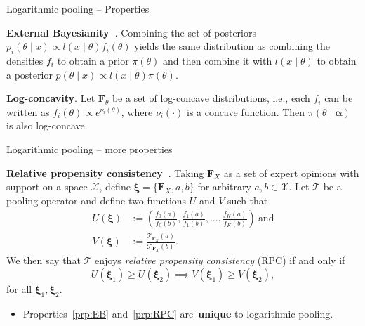 \begin{frame}{Logarithmic pooling -- Properties}
\begin{property}
\label{prp:EB}
 \textbf{External Bayesianity~\citep{genest1984}}. Combining the set of posteriors $p_i(\theta \mid x) \propto  l(x \mid \theta)f_i(\theta) $ yields the same distribution as combining the densities $f_i$ to obtain a prior $\pi(\theta)$ and then combine it with $l(x \mid \theta)$ to obtain a posterior $p(\theta \mid x) \propto l(x \mid \theta)\pi(\theta)$.
\end{property}

\begin{property}
\label{prp:concavity}
\textbf{Log-concavity}. 
 Let $\mathbf{F}_{\theta}$ be a set of log-concave distributions, i.e., each $f_i$ can be written as $ f_i(\theta) \propto e^{\nu_i(\theta)}$, where $\nu_i(\cdot)$ is a concave function.
Then $\pi(\theta\mid \boldsymbol \alpha)$ is also log-concave.
\end{property}
\end{frame}
\begin{frame}{Logarithmic pooling -- more properties}
\begin{property}
\label{prp:RPC}
\textbf{Relative propensity consistency~\citep{genest1984}}.
Taking $\boldsymbol F_{X}$ as a set of expert opinions with support on a space $\mathcal{X}$, define $\boldsymbol \xi = \{\boldsymbol F_{X}, a, b\}$ for arbitrary $a , b \in \mathcal{X}$.
Let $\mathcal{T}$ be a pooling operator and define two functions $U$ and $V$ such that 
\begin{align}
 U(\boldsymbol \xi) &:= \left( \frac{f_0(a)}{f_0(b)}, \frac{f_1(a)}{f_1(b)}, \ldots, \frac{f_K(a)}{f_K(b)} \right)\:\text{and}\\
 V(\boldsymbol \xi) & := \frac{\mathcal{T}_{\boldsymbol F_{X}} (a)}{\mathcal{T}_{\boldsymbol F_{X}} (b)}.
\end{align}
We then say that $\mathcal{T}$ enjoys \textit{relative propensity consistency} (RPC) if and only if
\begin{equation}
 U(\boldsymbol \xi_1) \geq U(\boldsymbol \xi_2) \implies  V(\boldsymbol \xi_1) \geq V(\boldsymbol \xi_2),
\end{equation}
for all $\boldsymbol \xi_1, \boldsymbol \xi_2$.
\end{property}

\begin{itemize}
 \item Properties~\ref{prp:EB} and~\ref{prp:RPC} are~\textbf{unique} to logarithmic pooling.
\end{itemize}

\end{frame}
